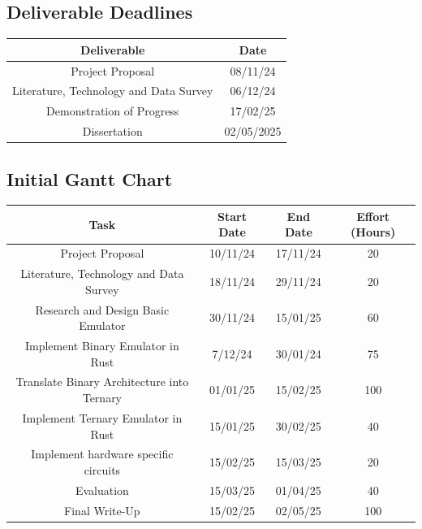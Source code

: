 \documentclass{article}
\begin{document}
\subsection{Deliverable Deadlines}

\begin{center}
\begin{tabular}{ |c|c| }
  \hline
  Deliverable & Date \\
  \hline\hline
  Project Proposal & 08/11/24 \\
  Literature, Technology and Data Survey & 06/12/24 \\
  Demonstration of Progress & 17/02/25 \\
  Dissertation & 02/05/2025 \\
  \hline
\end{tabular}
\end{center}

\subsection{Initial Gantt Chart}

\begin{center}
\begin{tabular}{ |c|c|c|c| }
  \hline
  Task & Start Date & End Date & Effort (Hours) \\
  \hline\hline
  Project Proposal & 10/11/24 & 17/11/24 & 20 \\
  Literature, Technology and Data Survey & 18/11/24 & 29/11/24 & 20 \\
  Research and Design Basic Emulator & 30/11/24 & 15/01/25 & 60 \\
  Implement Binary Emulator in Rust & 7/12/24 & 30/01/24 & 75 \\
  Translate Binary Architecture into Ternary & 01/01/25 & 15/02/25 & 100 \\ 
  Implement Ternary Emulator in Rust & 15/01/25 & 30/02/25 & 40 \\
  Implement hardware specific circuits & 15/02/25 & 15/03/25 & 20 \\
  Evaluation & 15/03/25 & 01/04/25 & 40 \\
  Final Write-Up & 15/02/25 & 02/05/25 & 100 \\
  \hline
\end{tabular}
\end{center}
\end{document}
